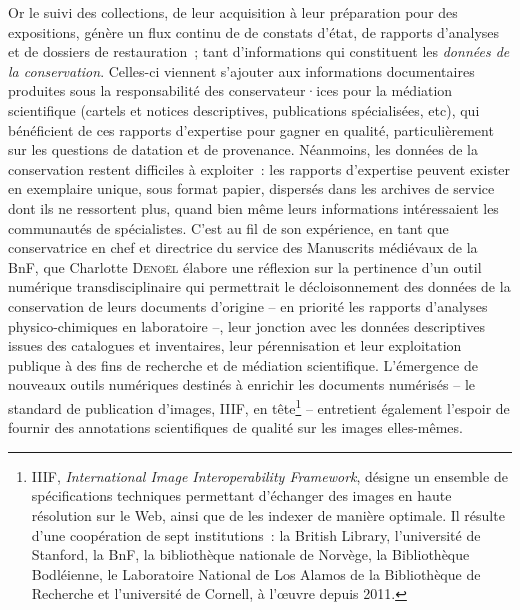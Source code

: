\documentclass[a4paper,12pt, twoside]{book}
\begin{document}
Or le suivi des collections, de leur acquisition à leur préparation pour des expositions, génère un flux continu de de constats d’état, de rapports d’analyses et de dossiers de restauration~; tant d’informations qui constituent les \textit{données de la conservation}. Celles-ci viennent s’ajouter aux informations documentaires produites sous la responsabilité des conservateur·ices pour la médiation scientifique (cartels et notices descriptives, publications spécialisées, etc), qui bénéficient de ces rapports d’expertise pour gagner en qualité, particulièrement sur les questions de datation et de provenance. Néanmoins, les données de la conservation restent difficiles à exploiter~: les rapports d’expertise peuvent exister en exemplaire unique, sous format papier, dispersés dans les archives de service dont ils ne ressortent plus, quand bien même leurs informations intéressaient les communautés de spécialistes. C’est au fil de son expérience, en tant que conservatrice en chef et directrice du service des Manuscrits médiévaux de la BnF, que Charlotte \textsc{Denoël} élabore une réflexion sur la pertinence d’un outil numérique transdisciplinaire qui permettrait le décloisonnement des données de la conservation de leurs documents d’origine -- en priorité les rapports d’analyses physico-chimiques en laboratoire --, leur jonction avec les données descriptives issues des catalogues et inventaires, leur pérennisation et leur exploitation publique à des fins de recherche et de médiation scientifique. L’émergence de nouveaux outils numériques destinés à enrichir les documents numérisés -- le standard de publication d’images, IIIF, en tête\footnote{IIIF, \emph{International Image Interoperability Framework}, désigne un ensemble de spécifications techniques permettant d’échanger des images en haute résolution sur le Web, ainsi que de les indexer de manière optimale. Il résulte d’une coopération de sept institutions~: la British Library, l’université de Stanford, la BnF, la bibliothèque nationale de Norvège, la Bibliothèque Bodléienne, le Laboratoire National de Los Alamos de la Bibliothèque de Recherche et l’université de Cornell, à l’œuvre depuis 2011.} -- entretient également l’espoir de fournir des annotations scientifiques de qualité sur les images elles-mêmes.
\end{document}
